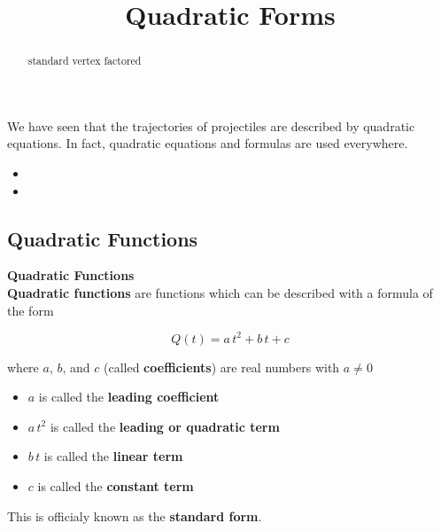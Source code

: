 \documentclass{ximera}
\title{Quadratic Forms}
\begin{document}
\begin{abstract}
standard vertex factored
\end{abstract}
\maketitle



We have seen that the trajectories of projectiles are described by quadratic equations.  In fact, quadratic equations and formulas are used everywhere.


\begin{itemize}
\item {}
\item {}
\end{itemize}







\subsection*{Quadratic Functions}


\begin{definition} \textbf{\textcolor{green!50!black}{Quadratic Functions}} \\
\textbf{Quadratic functions} are functions which can be described with a formula of the form

\[  Q(t) = a \, t^2 + b \, t + c  \]

where $a$, $b$, and $c$ (called \textbf{coefficients}) are real numbers with $a \ne 0$



\begin{itemize}
\item $a$ is called the \textbf{leading coefficient} 
\item $a \, t^2$ is called the \textbf{leading or quadratic term} 
\item $b \, t$ is called the \textbf{linear term} 
\item $c$ is called the \textbf{constant term} 
\end{itemize}


This is officialy known as the \textbf{standard form}.

\end{definition}
\end{document}
